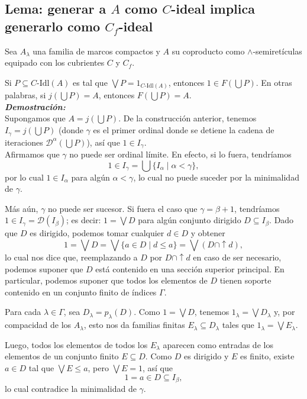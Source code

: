\documentclass[12pt,letterpaper,titlepage]{article}
\theoremstyle{definition}
\newcommand\Sup{\bigvee}
\renewcommand\inf{\wedge}
\newcommand\D{\mathcal D}
\newcommand\tps[2]{\texorpdfstring{#1}{#2}}
\newcommand\<{\langle}
\renewcommand\>{\rangle}
\newcommand\Idl{\text{-}\mathrm{Idl}}
\begin{document}
\subsection{Lema: generar a \tps{$A$}{A} como \tps{$C$}{C}-ideal implica generarlo como \tps{$C_f$}{Cf}-ideal}
    Sea $A_\lambda$ una familia de marcos compactos y $A$
    su coproducto como $\inf$-semiretículas equipado con
    los cubrientes $C$ y $C_f$.
    
    Si $P\subseteq C\Idl(A)$ es tal que $\Sup P=1_{C\Idl(A)}$,
    entonces $1\in F(\bigcup P)$.
    En otras palabras, si
    $j(\bigcup P)=A$, entonces $F(\bigcup P)=A$.
    \\
    \textbf{\emph{Demostración:}} \\
    Supongamos que $A=j(\bigcup P)$.
    De la construcción anterior, tenemos
    $I_\gamma=j(\bigcup P)$ (donde $\gamma$ es el primer
    ordinal donde se detiene la cadena de iteraciones
    $\D^\alpha(\bigcup P)$),
    así que $1\in I_\gamma$. \\
    Afirmamos que $\gamma$ no puede ser ordinal límite.
    En efecto, si lo fuera, tendríamos
    \[
        1 \in I_\gamma = \bigcup\{I_\alpha \mid \alpha<\gamma\}
    ,\]
    por lo cual $1\in I_\alpha$ para algún $\alpha<\gamma$, lo
    cual no puede suceder por la minimalidad de $\gamma$.

    Más aún, $\gamma$ no puede ser sucesor.
    Si fuera el caso que $\gamma=\beta+1$, tendríamos
    $1\in I_\gamma = \D(I_\beta)$;
    es decir: $1=\Sup D$ para algún conjunto dirigido
    $D\subseteq I_\beta$.
    Dado que $D$ es dirigido, podemos tomar cualquier
    $d\in D$ y obtener
    \[
        1
        = \Sup D
        = \Sup\{a\in D\mid d\leq a\}
        = \Sup(D\cap{\uparrow}d)
    ,\]
    lo cual nos dice que,
    reemplazando a $D$ por $D\cap{\uparrow}d$ en
    caso de ser necesario,
    podemos suponer que $D$ está contenido en una
    sección superior principal.
    En particular, podemos suponer que todos los elementos
    de $D$ tienen soporte contenido en
    un conjunto finito de índices $\Gamma$.

    Para cada $\lambda\in\Gamma$, sea $D_\lambda=p_\lambda(D)$.
    Como $1=\Sup D$, tenemos $1_\lambda=\Sup D_\lambda$ y,
    por compacidad de los $A_\lambda$, esto nos da familias finitas
    $E_\lambda\subseteq D_\lambda$ tales que
    $1_\lambda=\Sup E_\lambda$.
    
    Luego, todos los elementos de todos los $E_\lambda$ aparecen
    como entradas de los elementos de un conjunto finito
    $E\subseteq D$.
    Como $D$ es dirigido y $E$ es finito,
    existe $a\in D$ tal que $\Sup E\leq a$,
    pero $\Sup E=1$, así que
    \[
        1 = a \in D\subseteq I_\beta
    ,\]
    lo cual contradice la minimalidad de $\gamma$.
    
\end{document}
